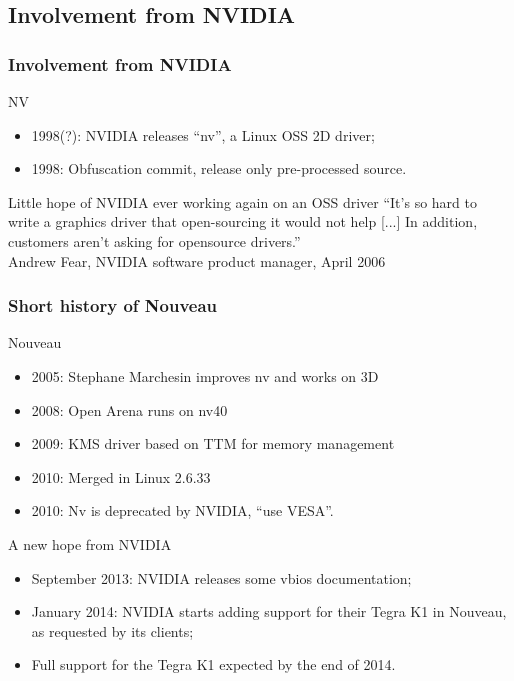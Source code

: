 \documentclass[11pt,english,compress]{beamer}
\begin{document}
\subsection{Involvement from NVIDIA}
\begin{frame}
	\frametitle{Involvement from NVIDIA}

	\begin{block}{NV}
		\begin{itemize}
			\item 1998(?): NVIDIA releases ``nv'', a Linux OSS 2D driver;
			\item 1998: Obfuscation commit, release only pre-processed source.
		\end{itemize}
	\end{block}

	\begin{block}{Little hope of NVIDIA ever working again on an OSS driver}
		``It's so hard to write a graphics driver that open-sourcing it
		would not help [...] In addition, customers aren't asking for opensource drivers.''\\
		Andrew Fear, NVIDIA software product manager, April 2006
	\end{block}

\end{frame}

\begin{frame}
	\frametitle{Short history of Nouveau}

	\begin{block}{Nouveau}
		\begin{itemize}
			\item 2005: Stephane Marchesin improves nv and works on 3D
			\item 2008: Open Arena runs on nv40
			\item 2009: KMS driver based on TTM for memory management
			\item 2010: Merged in Linux 2.6.33
			\item 2010: Nv is deprecated by NVIDIA, ``use VESA''.
		\end{itemize}
	\end{block}

	\begin{block}{A new hope from NVIDIA}
		\begin{itemize}
			\item September 2013: NVIDIA releases some vbios documentation;
			\item January 2014: NVIDIA starts adding support for their Tegra K1 in Nouveau, as requested by its clients;
			\item Full support for the Tegra K1 expected by the end of 2014.
		\end{itemize}
	\end{block}

\end{frame}
\end{document}
